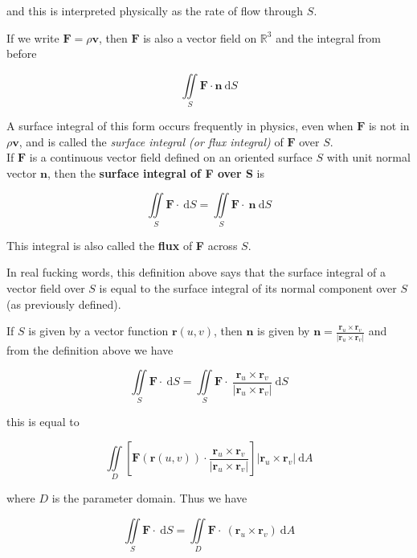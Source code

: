 \documentclass{article}
\begin{document}
and this is interpreted physically as the rate of flow through $S$. 

If we write $\mathbf{F} = \rho \mathbf{v}$, then $\mathbf{F}$ is also a vector field on $\mathbb{R}^3$ and the integral from before 

\begin{equation*}
    \iint\limits_{S} \mathbf{F} \cdot \mathbf{n} \ \mathrm{d}S
\end{equation*}

A surface integral of this form occurs frequently in physics, even when $\mathbf{F}$ is not in $\rho \mathbf{v}$, and is called the \textit{surface integral (or flux integral)} of $\mathbf{F}$ over $S$.
\\
If $\mathbf{F}$ is a continuous vector field defined on an oriented surface $S$ with unit normal vector $\mathbf{n}$, then the \textbf{surface integral of F over S} is 

\begin{equation*}
    \iint\limits_{S} \mathbf{F} \cdot \ \mathrm{d}S = \iint\limits_{S} \mathbf{F} \cdot \ \mathbf{n} \ \mathrm{d}S
\end{equation*}

This integral is also called the \textbf{flux} of \textbf{F} across $S$.

In real fucking words, this definition above says that the surface integral of a vector field over $S$ is equal to the surface integral of its normal component over $S$ (as previously defined). 

If $S$ is given by a vector function $\mathbf{r}(u,v)$, then $\mathbf{n}$ is given by $\mathbf{n} = \frac{\mathbf{r}_u \times \mathbf{r}_v}{\rvert \mathbf{r}_u \times \mathbf{r}_v \rvert}$ and from the definition above we have

\begin{equation*}
    \iint\limits_{S} \mathbf{F} \cdot \ \mathrm{d} S = \iint\limits_{S} \mathbf{F}  \cdot \ \frac{\mathbf{r}_u \times \mathbf{r}_v }{\rvert \mathbf{r}_u \times \mathbf{r}_v \rvert} \ \mathrm{d}S
\end{equation*}

this is equal to 

\begin{equation*}
    \iint\limits_{D} [\mathbf{F}(\mathbf{r}(u,v)) \cdot \frac{\mathbf{r}_u \times \mathbf{r}_v }{\rvert \mathbf{r}_u \times \mathbf{r}_v \rvert}] \rvert \mathbf{r}_u \times \mathbf{r}_v \rvert \ \mathrm{d}A
\end{equation*}

where $D$ is the parameter domain. Thus we have

\begin{equation*}
    \iint\limits_{S} \mathbf{F} \cdot \ \mathrm{d}S = \iint\limits_{D} \mathbf{F} \cdot \ (\mathbf{r}_u \times \mathbf{r}_v) \ \mathrm{d}A
\end{equation*}
\end{document}

